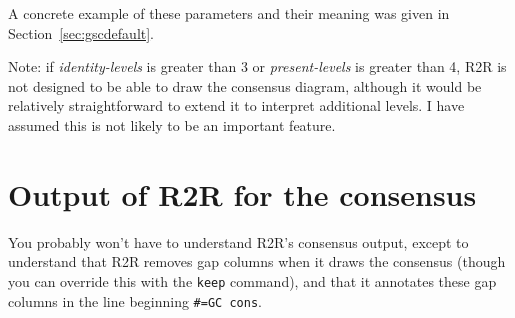 \documentclass[letterpaper,12pt]{report}
\begin{document}
A concrete example of these parameters and their meaning was given in Section~\ref{sec:gscdefault}.

Note: if {\it identity-levels} is greater than 3 or {\it present-levels} is greater than 4, R2R is not designed to be able to draw the consensus diagram, although it would be relatively straightforward to extend it to interpret additional levels.  I have assumed this is not likely to be an important feature.

\section{Output of R2R for the consensus}
\label{sec:gscmarkup}

You probably won't have to understand R2R's consensus output, except to
understand that R2R removes gap columns when it
draws the consensus (though you can override this with the {\tt keep} command), and that it annotates 
these gap columns in the line beginning {\tt \#=GC cons}.
\end{document}
